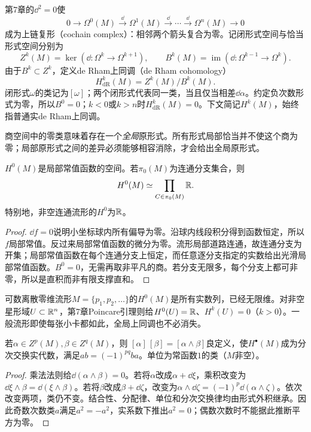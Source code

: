 \begin{definition}[de Rham复形与上同调]\label{def:de-rham}
第7章的$\dd^2=0$使
\[
 0\longrightarrow\Omega^0(M)\xrightarrow{\dd}\Omega^1(M)
 \xrightarrow{\dd}\cdots\xrightarrow{\dd}\Omega^n(M)\longrightarrow0
\]
成为上链复形（cochain complex）：相邻两个箭头复合为零。记闭形式空间与恰当形式空间分别为
\[
 Z^k(M)=\ker(\dd:\Omega^k\to\Omega^{k+1}),\qquad
 B^k(M)=\operatorname{im}(\dd:\Omega^{k-1}\to\Omega^k).
\]
由于$B^k\subset Z^k$，定义de Rham上同调（de Rham cohomology）
\[
 H^k_{\mathrm{dR}}(M)=Z^k(M)/B^k(M).
\]
闭形式$\omega$的类记为$[\omega]$；两个闭形式代表同一类，当且仅当相差$\dd\alpha$。约定负次数形式为零，所以$B^0=0$；$k<0$或$k>n$时$H^k_{\mathrm{dR}}(M)=0$。下文简记$H^k(M)$，始终指普通实de Rham上同调。
\end{definition}
商空间中的零类意味着存在一个\emph{全局}原形式。所有形式局部恰当并不使这个商为零；局部原形式之间的差异必须能够相容消除，才会给出全局原形式。

\begin{proposition}[零次上同调与分支]\label{prop:cohomology-zero}
$H^0(M)$是局部常值函数的空间。若$\pi_0(M)$为连通分支集合，则
\[
 H^0(M)\simeq\prod_{C\in\pi_0(M)}\mathbb{R}.
\]
特别地，非空连通流形的$H^0$为$\mathbb{R}$。
\end{proposition}
\begin{proof}
$\dd f=0$说明小坐标球内所有偏导为零。沿球内线段积分得到函数恒定，所以$f$局部常值。反过来局部常值函数的微分为零。流形局部道路连通，故连通分支为开集；局部常值函数在每个连通分支上恒定，而任意逐分支指定的实数给出光滑局部常值函数。$B^0=0$，无需再取非平凡的商。若分支无限多，每个分支上都可非零，所以是直积而非有限支撑直和。
\end{proof}
\begin{example}[维数不能从一张卡推断]
可数离散零维流形$M=\{p_1,p_2,\ldots\}$的$H^0(M)$是所有实数列，已经无限维。对非空星形域$U\subset\mathbb{R}^n$，第7章Poincare引理则给$H^0(U)=\mathbb{R}$、$H^k(U)=0$（$k>0$）。一般流形即使每张小卡都如此，全局上同调也不必消失。
\end{example}

\begin{proposition}[外积下降到上同调]\label{prop:cohomology-product}
若$\alpha\in Z^p(M),\beta\in Z^q(M)$，则
$[\alpha]\,[\beta]=[\alpha\wedge\beta]$良定义，使$H^\bullet(M)$成为分次交换实代数，满足$ab=(-1)^{pq}ba$。单位为常函数$1$的类（$M$非空）。
\end{proposition}
\begin{proof}
乘法法则给$\dd(\alpha\wedge\beta)=0$。若将$\alpha$改成$\alpha+\dd\xi$，乘积改变为$\dd\xi\wedge\beta=\dd(\xi\wedge\beta)$。若将$\beta$改成$\beta+\dd\zeta$，改变为$\alpha\wedge\dd\zeta=(-1)^p\dd(\alpha\wedge\zeta)$。依次改变两项，类仍不变。结合性、分配律、单位和分次交换律均由形式外积继承。因此奇数次数类$a$满足$a^2=-a^2$，实系数下推出$a^2=0$；偶数次数时不能据此推断平方为零。
\end{proof}

